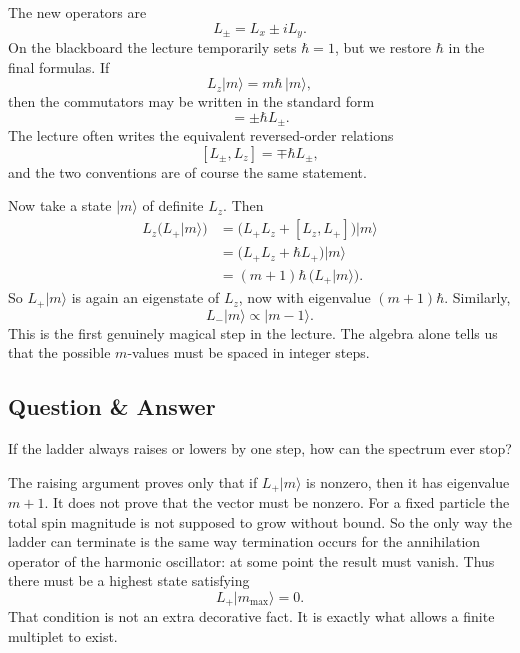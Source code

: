 The new operators are
\begin{equation}
L_\pm=L_x\pm iL_y.
\end{equation}
On the blackboard the lecture temporarily sets \(\hbar=1\), but we restore \(\hbar\) in the final formulas. If
\begin{equation}
L_z\lvert m\rangle=m\hbar\,\lvert m\rangle,
\end{equation}
then the commutators may be written in the standard form
\begin{equation}
[L_z,L_\pm]=\pm \hbar L_\pm.
\end{equation}
The lecture often writes the equivalent reversed-order relations
\[
[L_\pm,L_z]=\mp \hbar L_\pm,
\]
and the two conventions are of course the same statement.

Now take a state \(\lvert m\rangle\) of definite \(L_z\). Then
\begin{align}
L_z\bigl(L_+\lvert m\rangle\bigr)
&=\bigl(L_+L_z+[L_z,L_+]\bigr)\lvert m\rangle \\
&=\bigl(L_+L_z+\hbar L_+\bigr)\lvert m\rangle \\
&=(m+1)\hbar\,\bigl(L_+\lvert m\rangle\bigr).
\end{align}
So \(L_+\lvert m\rangle\) is again an eigenstate of \(L_z\), now with eigenvalue \((m+1)\hbar\). Similarly,
\begin{equation}
L_-\lvert m\rangle \propto \lvert m-1\rangle.
\end{equation}
This is the first genuinely magical step in the lecture. The algebra alone tells us that the possible \(m\)-values must be spaced in integer steps.

\subsection{Question \& Answer}

If the ladder always raises or lowers by one step, how can the spectrum ever stop?

The raising argument proves only that if \(L_+\lvert m\rangle\) is nonzero, then it has eigenvalue \(m+1\). It does not prove that the vector must be nonzero. For a fixed particle the total spin magnitude is not supposed to grow without bound. So the only way the ladder can terminate is the same way termination occurs for the annihilation operator of the harmonic oscillator: at some point the result must vanish. Thus there must be a highest state satisfying
\begin{equation}
L_+\lvert m_{\max}\rangle=0.
\end{equation}
That condition is not an extra decorative fact. It is exactly what allows a finite multiplet to exist.

